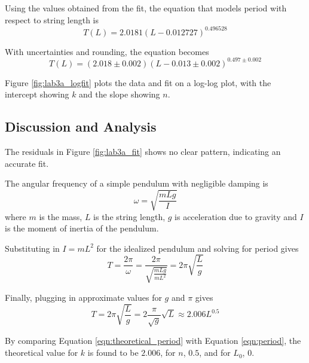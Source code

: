 \documentclass[aps,twocolumn,secnumarabic,nobalancelastpage,amsmath,amssymb,nofootinbib,floatfix,letterpaper]{revtex4}
\begin{document}
Using the values obtained from the fit, the equation that models period with respect to string length is
\begin{equation}
    T(L) = 2.0181(L - 0.012727)^{0.496528}
    \label{eqn:actual_period}
\end{equation}

With uncertainties and rounding, the equation becomes
\begin{equation}
    T(L) = (2.018 \pm 0.002)(L - 0.013 \pm 0.002)^{0.497 \pm 0.002}
\end{equation}

Figure \ref{fig:lab3a_logfit} plots the data and fit on a log-log plot, with the intercept showing \(k\) and the slope
showing \(n\).

\subsection{Discussion and Analysis}
\label{sec:lab3a_analysis}

The residuals in Figure \ref{fig:lab3a_fit} shows no clear pattern, indicating an accurate fit.

The angular frequency of a simple pendulum with negligible damping is \cite[p. 507]{mazur}
\begin{equation}
    \omega = \sqrt{\frac{mLg}{I}}
\end{equation}
where \(m\) is the mass, \(L\) is the string length, \(g\) is acceleration due to gravity and \(I\) is the moment of
inertia of the pendulum.

Substituting in \(I = mL^2\) for the idealized pendulum and solving for period gives
\begin{equation}
    T = \frac{2\pi}{\omega} = \frac{2\pi}{\sqrt{\frac{mLg}{mL^2}}} = 2\pi\sqrt{\frac{L}{g}}
\end{equation}

Finally, plugging in approximate values for \(g\) and \(\pi\) gives
\begin{equation}
    T = 2\pi\sqrt{\frac{L}{g}} = 2\frac{\pi}{\sqrt{g}}\sqrt{L} \approx 2.006L^{0.5}
    \label{eqn:theoretical_period}
\end{equation}

By comparing Equation \ref{eqn:theoretical_period} with Equation \ref{eqn:period}, the theoretical value for \(k\) is found to be
\(2.006\), for \(n\), \(0.5\), and for \(L_0\), \(0\).
\end{document}
